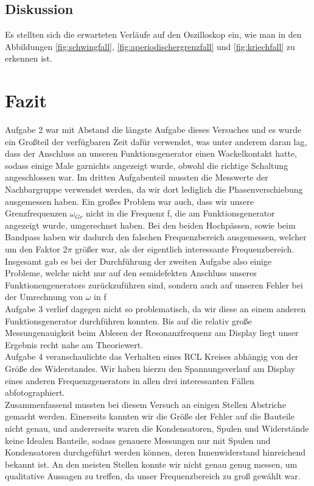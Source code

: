 \documentclass[12pt]{scrartcl}
\begin{document}
\subsection{Diskussion}
Es stellten sich die erwarteten Verläufe auf den Oszilloskop ein, wie man in den Abbildungen \ref{fig:schwingfall}, \ref{fig:aperiodischergrenzfall} und \ref{fig:kriechfall} zu erkennen ist.

\section{Fazit}
Aufgabe 2 war mit Abstand die längste Aufgabe dieses Versuches und es wurde ein Großteil der verfügbaren Zeit dafür verwendet, was unter anderem daran lag, dass der Anschluss an unseren Funktionsgenerator einen Wackelkontakt hatte, sodass einige Male garnichts angezeigt wurde, obwohl die richtige Schaltung angeschlossen war. Im dritten Aufgabenteil mussten die Messwerte der Nachbargruppe verwendet werden, da wir dort lediglich die Phasenverschiebung ausgemessen haben. Ein großes Problem war auch, dass wir unsere Grenzfrequenzen $\omega_{Gr}$ nicht in die Frequenz f, die am Funktionsgenerator angezeigt wurde, umgerechnet haben. Bei den beiden Hochpässen, sowie beim Bandpass haben wir dadurch den falschen Frequenzbereich ausgemessen, welcher um den Faktor 2$\pi$ größer war, als der eigentlich interessante Frequenzbereich. Insgesamt gab es bei der Durchführung der zweiten Aufgabe also einige Probleme, welche nicht nur auf den semidefekten Anschluss unseres Funktionengenerators zurückzuführen sind, sondern auch auf unseren Fehler bei der Umrechnung von $\omega$ in f\\
Aufgabe 3 verlief dagegen nicht so problematisch, da wir diese an einem anderen Funktionsgenerator durchführen konnten. Bis auf die relativ große Messungenauigkeit beim Ablesen der Resonanzfrequenz am Display liegt unser Ergebnis recht nahe am Theoriewert.\\
Aufgabe 4 veranschaulichte das Verhalten eines RCL Kreises abhängig von der Größe des Widerstandes. Wir haben hierzu den Spannungsverlauf am Display eines anderen Frequenzgenerators in allen drei interessanten Fällen abfotographiert.\\
Zusammenfassend mussten bei diesem Versuch an einigen Stellen Abstriche gemacht werden. Einerseits kannten wir die Größe der Fehler auf die Bauteile nicht genau, und andererseits waren die Kondensatoren, Spulen und Widerstände keine Idealen Bauteile, sodass genauere Messungen nur mit Spulen und Kondensatoren durchgeführt werden können, deren Innenwiderstand hinreichend bekannt ist. An den meisten Stellen konnte wir nicht genau genug messen, um qualitative Aussagen zu treffen, da unser Frequenzbereich zu groß gewählt war.
\end{document}
